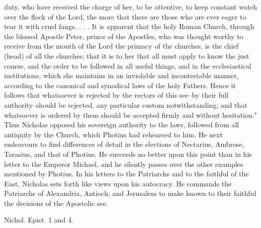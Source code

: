 duty, who have received the charge of her, to be attentive, to keep constant watch over the flock of the Lord, the more that there are those who are ever eager to tear it with cruel fangs. . . . It is apparent that the holy Roman Church, through the blessed Apostle Peter, prince of the Apostles, who was thought worthy to receive from the mouth of the Lord the primacy of the churches, is the chief (head) of all the churches; that it is to her that all must apply to know the just course, and the order to be followed in all useful things, and in the ecclesiastical institutions, which she maintains in an inviolable and incontestable manner, according to the canonical and synodical laws of the holy Fathers. Hence it follows that whatsoever is rejected by the rectors of this see--by their full authority--should be rejected, any particular custom notwithstanding; and that whatsoever is ordered by them should be accepted firmly and without hesitation." Thus Nicholas opposed his sovereign authority to the laws, followed from all antiquity by the Church, which Photius had rehearsed to him. He next endeavours to find differences of detail in the elections of Nectarius, Ambrose, Tarasius, and that of Photius. He succeeds no better upon this point than in his letter to the Emperor Michael, and he silently passes over the other examples mentioned by Photius. In his letters to the Patriarchs and to the faithful of the East, Nicholas sets forth like views upon his autocracy. He commands the Patriarchs of Alexandria, Antioch, and Jerusalem to make known to their faithful the decisions of the Apostolic see.

Nichol. Epist. 1 and 4.

